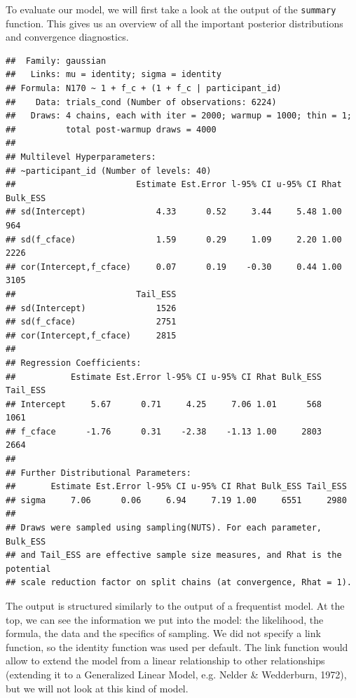 \documentclass[
  doc,12pt,floatsintext]{apa7}
\begin{document}
To evaluate our model, we will first take a look at the output of the \texttt{summary} function. This gives us an overview of all the important posterior distributions and convergence diagnostics.



\footnotesize

\begin{verbatim}
##  Family: gaussian 
##   Links: mu = identity; sigma = identity 
## Formula: N170 ~ 1 + f_c + (1 + f_c | participant_id) 
##    Data: trials_cond (Number of observations: 6224) 
##   Draws: 4 chains, each with iter = 2000; warmup = 1000; thin = 1;
##          total post-warmup draws = 4000
## 
## Multilevel Hyperparameters:
## ~participant_id (Number of levels: 40) 
##                        Estimate Est.Error l-95% CI u-95% CI Rhat Bulk_ESS
## sd(Intercept)              4.33      0.52     3.44     5.48 1.00      964
## sd(f_cface)                1.59      0.29     1.09     2.20 1.00     2226
## cor(Intercept,f_cface)     0.07      0.19    -0.30     0.44 1.00     3105
##                        Tail_ESS
## sd(Intercept)              1526
## sd(f_cface)                2751
## cor(Intercept,f_cface)     2815
## 
## Regression Coefficients:
##           Estimate Est.Error l-95% CI u-95% CI Rhat Bulk_ESS Tail_ESS
## Intercept     5.67      0.71     4.25     7.06 1.01      568     1061
## f_cface      -1.76      0.31    -2.38    -1.13 1.00     2803     2664
## 
## Further Distributional Parameters:
##       Estimate Est.Error l-95% CI u-95% CI Rhat Bulk_ESS Tail_ESS
## sigma     7.06      0.06     6.94     7.19 1.00     6551     2980
## 
## Draws were sampled using sampling(NUTS). For each parameter, Bulk_ESS
## and Tail_ESS are effective sample size measures, and Rhat is the potential
## scale reduction factor on split chains (at convergence, Rhat = 1).
\end{verbatim}

\normalsize

The output is structured similarly to the output of a frequentist model. At the top, we can see the information we put into the model: the likelihood, the formula, the data and the specifics of sampling. We did not specify a link function, so the identity function was used per default. The link function would allow to extend the model from a linear relationship to other relationships (extending it to a Generalized Linear Model, e.g. Nelder \& Wedderburn, 1972), but we will not look at this kind of model.
\end{document}
